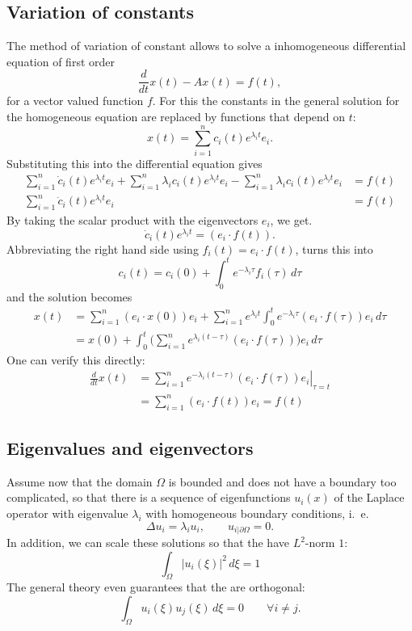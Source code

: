 \subsection{Variation of constants}
The method of variation of constant allows to solve a inhomogeneous
differential equation of first order
\[
\frac{d}{dt}x(t)-Ax(t)=f(t),
\]
for a vector valued function $f$.
For this the constants in the general solution for the homogeneous 
equation are replaced by functions that depend on $t$:
\[
x(t)=\sum_{i=1}^nc_i(t)e^{\lambda_it}e_i.
\]
Substituting this into the differential equation gives
\begin{align*}
\sum_{i=1}^n\dot c_i(t)e^{\lambda_it}e_i
+
\sum_{i=1}^n\lambda_i c_i(t)e^{\lambda_it}e_i
-\sum_{i=1}^n\lambda_i c_i(t)e^{\lambda_it}e_i
&=
f(t)
\\
\sum_{i=1}^n\dot c_i(t)e^{\lambda_it}e_i
&=
f(t)
\end{align*}
By taking the scalar product with the eigenvectors
$e_i$, we get.
\[
\dot c_i(t)e^{\lambda_i t}=(e_i\cdot f(t)).
\]
Abbreviating the right hand side using
$f_i(t)=e_i\cdot f(t)$, turns this into
\[
c_i(t)=c_i(0)+\int_0^te^{-\lambda_i \tau}f_i(\tau)\,d\tau
\]
and the solution becomes
\begin{align*}
x(t)&=
\sum_{i=1}^n
(e_i\cdot x(0))e_i+
\sum_{i=1}^ne^{\lambda_i t}\int_0^te^{-\lambda_i \tau}(e_i\cdot f(\tau))e_i\,d\tau
\\
&=
x(0)
+
\int_0^t
\biggl(
\sum_{i=1}^n
e^{\lambda_i(t- \tau)}(e_i\cdot f(\tau))\biggr)e_i\,d\tau
\end{align*}
One can verify this directly:
\begin{align*}
\frac{d}{dt}x(t)
&=
\sum_{i=1}^n\left.e^{-\lambda_i (t-\tau)}(e_i\cdot f(\tau))e_i \right|_{\tau=t}
\\
&=
\sum_{i=1}^n(e_i\cdot f(t))e_i=f(t)
\end{align*}

\subsection{Eigenvalues and eigenvectors}
Assume now that the domain $\Omega$ is bounded and does not have a 
boundary too complicated, so that there is a sequence of eigenfunctions
$u_i(x)$ of the Laplace operator with eigenvalue $\lambda_i$
with homogeneous boundary conditions, i.~e.
\[
\Delta u_i=\lambda_iu_i,\qquad u_{i|\partial\Omega} = 0.
\]
In addition, we can scale these solutions so that the have 
$L^2$-norm $1$:
\[
\int_{\Omega}|u_i(\xi)|^2\,d\xi=1
\]
The general theory even guarantees that the are orthogonal:
\[
\int_{\Omega}u_i(\xi)u_j(\xi)\,d\xi=0\qquad\forall i\ne j.
\]

